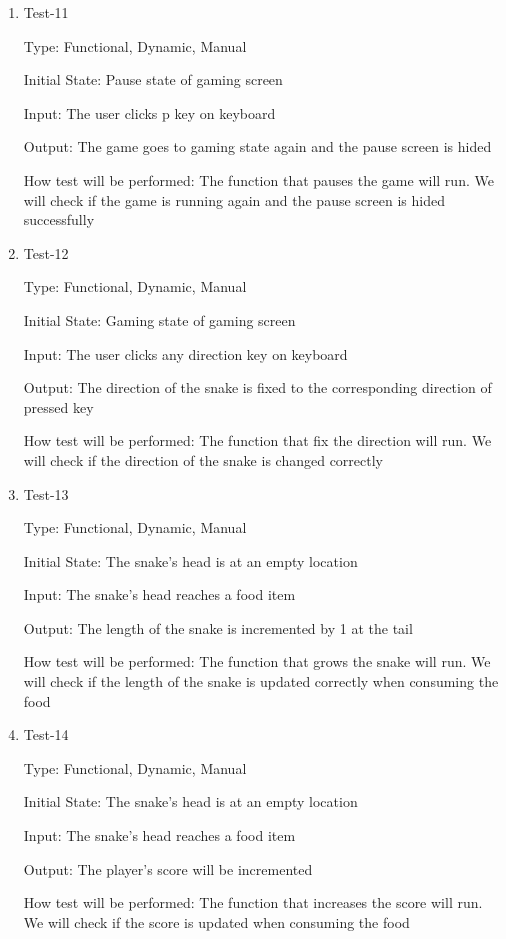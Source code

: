 \documentclass[12pt, titlepage]{article}
\begin{document}
\begin{enumerate}
\item{Test-11\\}

Type: Functional, Dynamic, Manual

Initial State: Pause state of gaming screen

Input: The user clicks p key on keyboard

Output: The game goes to gaming state again and the pause screen is hided

How test will be performed: The function that pauses the game will run. We will check if the game is running again and the pause screen is hided successfully

\item{Test-12\\}

Type: Functional, Dynamic, Manual

Initial State: Gaming state of gaming screen

Input: The user clicks any direction key on keyboard

Output: The direction of the snake is fixed to the corresponding direction of pressed key

How test will be performed: The function that fix the direction will run. We will check if the direction of the snake is changed correctly

\item{Test-13\\}

Type: Functional, Dynamic, Manual

Initial State: The snake's head is at an empty location

Input: The snake's head reaches a food item

Output: The length of the snake is incremented by 1 at the tail

How test will be performed: The function that grows the snake will run. We will check if the length of the snake is updated correctly when consuming the food

\item{Test-14\\}

Type: Functional, Dynamic, Manual

Initial State: The snake's head is at an empty location

Input: The snake's head reaches a food item

Output: The player's score will be incremented

How test will be performed: The function that increases the score will run. We will check if the score is updated when consuming the food


\end{enumerate}
\end{document}
